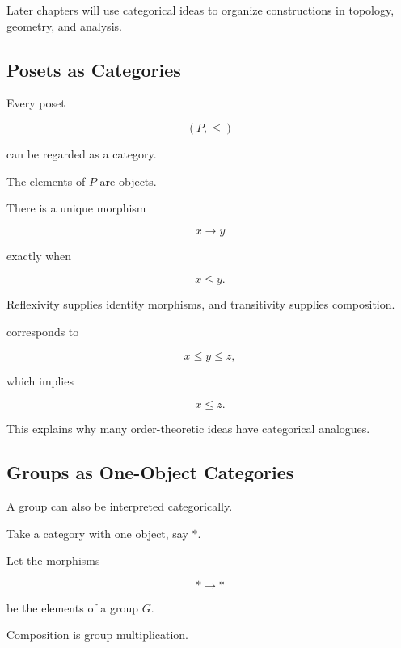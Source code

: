 Later chapters will use categorical ideas to organize constructions in
topology, geometry, and analysis.

\subsection{Posets as Categories}
\label{subsec:posets-as-categories}

Every poset

\[ (P,\leq) \]

can be regarded as a category.

The elements of \(P\) are objects.

There is a unique morphism

\[ x\to y \]

exactly when

\[ x\leq y. \]

Reflexivity supplies identity morphisms, and transitivity supplies
composition.

\begin{center}
\end{center}

corresponds to

\[ x\leq y\leq z, \]

which implies

\[ x\leq z. \]

This explains why many order-theoretic ideas have categorical analogues.

\subsection{Groups as One-Object Categories}
\label{subsec:groups-one-object-category}

A group can also be interpreted categorically.

Take a category with one object, say \(*\).

Let the morphisms

\[ *\to* \]

be the elements of a group \(G\).

Composition is group multiplication.

